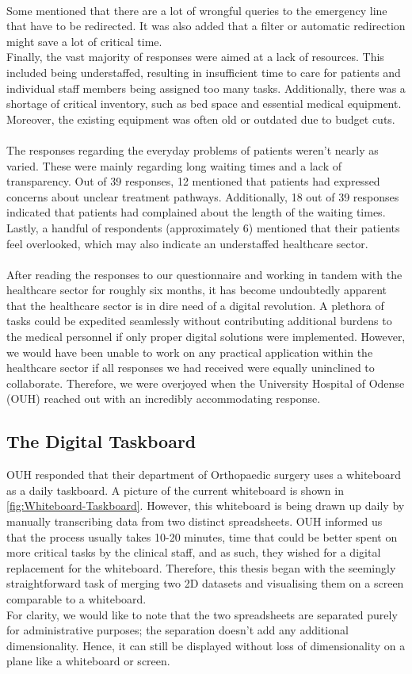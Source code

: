 \\
Some mentioned that there are a lot of wrongful queries to the emergency line that have to be redirected. It was also added that a filter or automatic redirection might save a lot of critical time.
\\
Finally, the vast majority of responses were aimed at a lack of resources. This included being understaffed, resulting in insufficient time to care for patients and individual staff members being assigned too many tasks. Additionally, there was a shortage of critical inventory, such as bed space and essential medical equipment. Moreover, the existing equipment was often old or outdated due to budget cuts.
\\
\\
The responses regarding the everyday problems of patients weren't nearly as varied. These were mainly regarding long waiting times and a lack of transparency. Out of 39 responses, 12 mentioned that patients had expressed concerns about unclear treatment pathways. Additionally, 18 out of 39 responses indicated that patients had complained about the length of the waiting times. Lastly, a handful of respondents (approximately 6) mentioned that their patients feel overlooked, which may also indicate an understaffed healthcare sector.
\\
\\
After reading the responses to our questionnaire and working in tandem with the healthcare sector for roughly six months, it has become undoubtedly apparent that the healthcare sector is in dire need of a digital revolution. A plethora of tasks could be expedited seamlessly without contributing additional burdens to the medical personnel if only proper digital solutions were implemented. However, we would have been unable to work on any practical application within the healthcare sector if all responses we had received were equally uninclined to collaborate. Therefore, we were overjoyed when the University Hospital of Odense (OUH) reached out with an incredibly accommodating response.

\subsection{The Digital Taskboard}
OUH responded that their department of Orthopaedic surgery uses a whiteboard as a daily taskboard. A picture of the current whiteboard is shown in \autoref{fig:Whiteboard-Taskboard}. However, this whiteboard is being drawn up daily by manually transcribing data from two distinct spreadsheets. OUH  informed us that the process usually takes 10-20 minutes, time that could be better spent on more critical tasks by the clinical staff, and as such, they wished for a digital replacement for the whiteboard. Therefore, this thesis began with the seemingly straightforward task of merging two 2D datasets and visualising them on a screen comparable to a whiteboard.
\\
For clarity, we would like to note that the two spreadsheets are separated purely for administrative purposes; the separation doesn't add any additional dimensionality. Hence, it can still be displayed without loss of dimensionality on a plane like a whiteboard or screen. 


